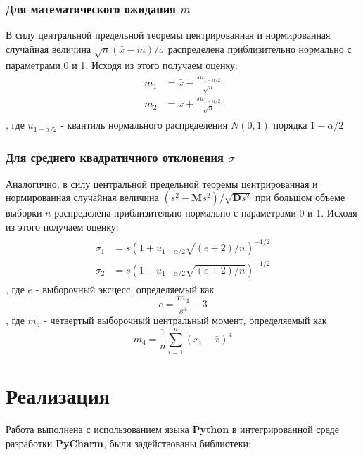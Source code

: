 \documentclass[12pt,a4paper]{article}
\begin{document}
\subsubsection{Для математического ожидания $m$}
В силу центральной предельной теоремы центрированная и нормированная случайная величина $\sqrt{n} (\bar{x} - m) / \sigma$ распределена приблизительно нормально с параметрами 0 и 1. Исходя из этого\cite[стр. 460]{verrazdely} получаем оценку:
\begin{align}\label{lab8:3}
\begin{split}
	m_1 &= \bar{x} - \frac{s u_{1 - \alpha / 2}}{\sqrt{n}} \\
	m_2 &= \bar{x} + \frac{s u_{1 - \alpha / 2}}{\sqrt{n}}
\end{split}
\end{align}
, где $u_{1 - \alpha /2}$ - квантиль нормального распределения $N(0, 1)$ порядка $1 - \alpha / 2$

\subsubsection{Для среднего квадратичного отклонения $\sigma$}
Аналогично, в силу центральной предельной теоремы центрированная и нормированная случайная величина $(s^2 - \mathbf{M}s^2) / \sqrt{\mathbf{D}s^2}$ при большом объеме выборки $n$ распределена приблизительно нормально с параметрами 0 и 1. Исходя из этого\cite[стр. 461]{verrazdely} получаем оценку:
\begin{align}\label{lab8:4}
\begin{split}
	\sigma_1 &= s\left(1 + u_{1 - \alpha / 2} \sqrt{(e+2) / n}\right)^{-1 / 2} \\
	\sigma_2 &= s\left(1 - u_{1 - \alpha / 2} \sqrt{(e+2) / n}\right)^{-1 / 2}
\end{split}
\end{align}
, где $e$ - выборочный эксцесс, определяемый как
\begin{equation}
	e = \frac{m_4}{s^4} - 3
\end{equation}
, где $m_4$ - четвертый выборочный центральный момент, определяемый как
\begin{equation}
	m_4 = \frac{1}{n} \sum_{i=1}^{n}\left(x_{i}-\bar{x}\right)^4
\end{equation}
\pagebreak

\section{Реализация}
\label{sec:impl}
Работа выполнена с использованием языка \textbf{Python} в интегрированной среде разработки \textbf{PyCharm}, были задействованы библиотеки:
\end{document}
